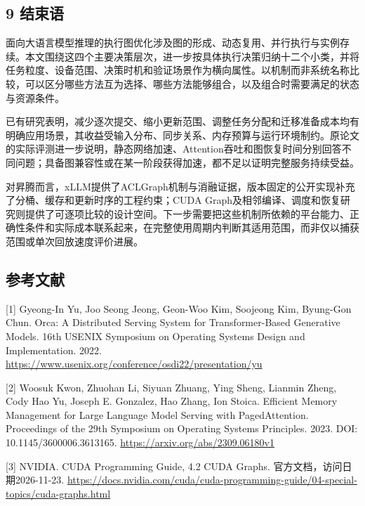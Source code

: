 \documentclass[UTF8,11pt,fontset=windows]{ctexart}
\begin{document}
\hypertarget{section-9}{%
\subsection{9 结束语}\label{section-9}}

面向大语言模型推理的执行图优化涉及图的形成、动态复用、并行执行与实例存续。本文围绕这四个主要决策层次，进一步按具体执行决策归纳十二个小类，并将任务粒度、设备范围、决策时机和验证场景作为横向属性。以机制而非系统名称比较，可以区分哪些方法互为选择、哪些方法能够组合，以及组合时需要满足的状态与资源条件。

已有研究表明，减少逐次提交、缩小更新范围、调整任务分配和迁移准备成本均有明确应用场景，其收益受输入分布、同步关系、内存预算与运行环境制约。原论文的实际评测进一步说明，静态网络加速、Attention吞吐和图恢复时间分别回答不同问题；具备图兼容性或在某一阶段获得加速，都不足以证明完整服务持续受益。

对昇腾而言，xLLM提供了ACLGraph机制与消融证据，版本固定的公开实现补充了分桶、缓存和更新时序的工程约束；CUDA Graph及相邻编译、调度和恢复研究则提供了可逐项比较的设计空间。下一步需要把这些机制所依赖的平台能力、正确性条件和实际成本联系起来，在完整使用周期内判断其适用范围，而非仅以捕获范围或单次回放速度评价进展。

\hypertarget{references}{%
\subsection{参考文献}\label{references}}

\leavevmode{}%
{[}1{]} Gyeong-In Yu, Joo Seong Jeong, Geon-Woo Kim, Soojeong Kim, Byung-Gon Chun. Orca: A Distributed Serving System for Transformer-Based Generative Models. 16th USENIX Symposium on Operating Systems Design and Implementation. 2022. \url{https://www.usenix.org/conference/osdi22/presentation/yu}

\leavevmode{}%
{[}2{]} Woosuk Kwon, Zhuohan Li, Siyuan Zhuang, Ying Sheng, Lianmin Zheng, Cody Hao Yu, Joseph E. Gonzalez, Hao Zhang, Ion Stoica. Efficient Memory Management for Large Language Model Serving with PagedAttention. Proceedings of the 29th Symposium on Operating Systems Principles. 2023. DOI: 10.1145/3600006.3613165. \url{https://arxiv.org/abs/2309.06180v1}

\leavevmode{}%
{[}3{]} NVIDIA. CUDA Programming Guide, 4.2 CUDA Graphs. 官方文档，访问日期2026-11-23. \url{https://docs.nvidia.com/cuda/cuda-programming-guide/04-special-topics/cuda-graphs.html}
\end{document}
